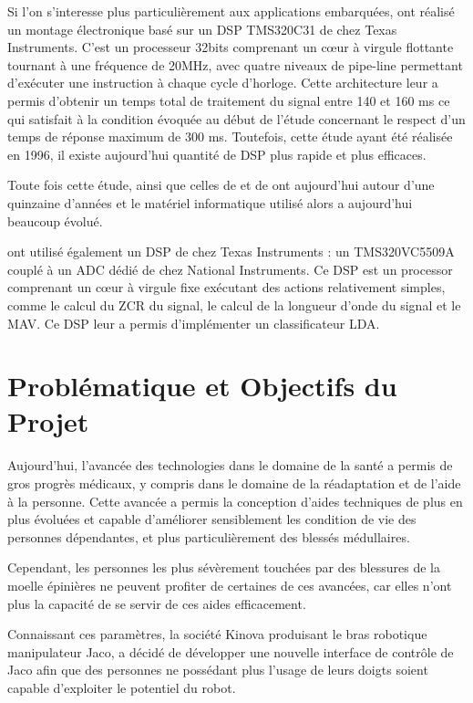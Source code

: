 \documentclass[letterpaper, twoside, 12pt, memoire, creativecommons, hyperref]{thETS}
\begin{document}
Si l'on s'interesse plus particulièrement aux applications embarquées, \cite{Chang1996} ont réalisé un montage électronique basé sur un DSP TMS320C31 de chez Texas Instruments. C’est un processeur 32bits comprenant un cœur à virgule flottante tournant à une fréquence de 20MHz, avec quatre niveaux de pipe-line permettant d’exécuter une instruction à chaque cycle d’horloge. Cette architecture leur a permis d’obtenir un temps total de traitement du signal entre 140 et 160 ms ce qui satisfait à la condition évoquée au début de l’étude concernant le respect d’un temps de réponse maximum de 300 ms. Toutefois, cette étude ayant été réalisée en 1996, il existe aujourd’hui quantité de DSP plus rapide et plus efficaces.

Toute fois cette étude, ainsi que celles de \cite{martinez1999} et de \cite{prasad1996} ont aujourd'hui autour d'une quinzaine d'années et le matériel informatique utilisé alors a aujourd'hui beaucoup évolué.

\cite{Tenore2007} ont utilisé également un DSP de chez Texas Instruments : un TMS320VC5509A couplé à un ADC dédié de chez National Instruments. Ce DSP est un processor comprenant un cœur à virgule fixe exécutant des actions relativement simples, comme le calcul du ZCR du signal, le calcul de la longueur d’onde du signal et le MAV. Ce DSP leur a permis d'implémenter un classificateur LDA.

\chapter{Problématique et Objectifs du Projet}

Aujourd'hui, l'avancée des technologies dans le domaine de la santé a permis de gros progrès médicaux, y compris dans le domaine de la réadaptation et de l'aide à la personne. Cette avancée a permis la conception d'aides techniques de plus en plus évoluées et capable d'améliorer sensiblement les condition de vie des personnes dépendantes, et plus particulièrement des blessés médullaires. 

Cependant, les personnes les plus sévèrement touchées par des blessures de la moelle épinières ne peuvent profiter de certaines de ces avancées, car elles n'ont plus la capacité de se servir de ces aides efficacement. 

Connaissant ces paramètres, la société Kinova produisant le bras robotique manipulateur Jaco, a décidé de développer une nouvelle interface de contrôle de Jaco afin que des personnes ne possédant plus l'usage de leurs doigts soient capable d'exploiter le potentiel du robot.
\end{document}
